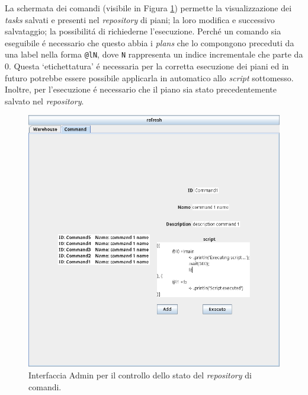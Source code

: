 \parag
La schermata dei comandi (visibile in Figura \ref{fig:application-command}) permette la visualizzazione dei \textit{tasks} salvati e presenti nel \textit{repository} di piani; la loro modifica e successivo salvataggio; la possibilit\'a di richiederne l'esecuzione. Perch\'e un comando sia eseguibile \'e necessario che questo abbia i \textit{plans} che lo compongono preceduti da una label nella forma \texttt{@lN}, dove \texttt{N} rappresenta un indice incrementale che parte da 0. Questa `etichettatura' \'e necessaria per la corretta esecuzione dei piani ed in futuro potrebbe essere possibile applicarla in automatico allo \textit{script} sottomesso. Inoltre, per l'esecuzione \'e necessario che il piano sia stato precedentemente salvato nel \textit{repository}.
\begin{figure}[!ht]\centering
    \includegraphics[width=.75\textwidth]{section/usage_examples/figure/application-command.png}
    \caption{Interfaccia Admin per il controllo dello stato del \textit{repository} di comandi.}
    \label{fig:application-command}
\end{figure}
